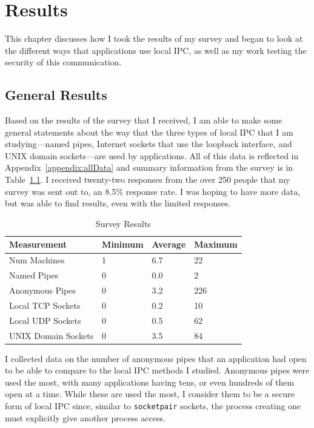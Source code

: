 \chapter{Results}
\label{sec:results}
This chapter discusses how I took the results of my survey and began to look at the different ways that applications use local IPC, as well as my work testing the security of this communication.

\section{General Results}
\label{sec:generalResults}
Based on the results of the survey that I received, I am able to make some general statements about the way that the three types of local IPC that I am studying---named pipes, Internet sockets that use the loopback interface, and UNIX domain sockets---are used by applications.  All of this data is reflected in Appendix~\ref{appendix:allData} and summary information from the survey is in Table~\ref{tab:surveyResults}.  I received twenty-two responses from the over 250 people that my survey was sent out to, an 8.5\% response rate.  I was hoping to have more data, but was able to find results, even with the limited responses.

\begin{table}
\centering
\begin{small}
\begin{tabular}{ l | l | l | l }
\textbf{Measurement} & \textbf{Minimum} & \textbf{Average} & \textbf{Maximum} \\ \hline
Num Machines & 1 & 6.7 & 22 \\ \hline
Named Pipes & 0 & 0.0 & 2 \\ \hline
Anonymous Pipes & 0 & 3.2 & 226 \\ \hline
Local TCP Sockets & 0 & 0.2 & 10 \\ \hline
Local UDP Sockets & 0 & 0.5 & 62 \\ \hline
UNIX Domain Sockets & 0 & 3.5 & 84 \\ \hline
\end{tabular}
\caption{Survey Results}
\label{tab:surveyResults}
\end{small}
\end{table} 

I collected data on the number of anonymous pipes that an application had open to be able to compare to the local IPC methods I studied.  Anonymous pipes were used the most, with many applications having tens, or even hundreds of them open at a time.  While these are used the most, I consider them to be a secure form of local IPC since, similar to \texttt{socketpair} sockets, the process creating one must explicitly give another process access.

